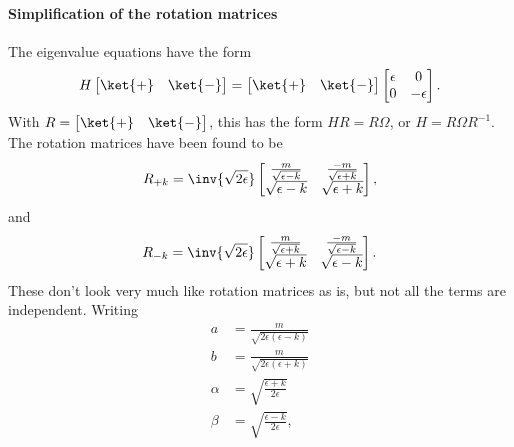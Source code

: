 \paragraph{Simplification of the rotation matrices}
The eigenvalue equations have the form
%
\begin{dmath}\label{eqn:gradQuantumProblemSet4Problem3:240}
H
\begin{bmatrix}
\ket{+} & \ket{-}
\end{bmatrix}
=
\begin{bmatrix}
\ket{+} & \ket{-}
\end{bmatrix}
\begin{bmatrix}
\epsilon & 0 \\
0 & -\epsilon
\end{bmatrix}.
\end{dmath}
With \( R = \begin{bmatrix} \ket{+} & \ket{-} \end{bmatrix} \), this has the form \( H R = R \Omega \), or \( H = R \Omega R^{-1} \).  The rotation matrices have been found to be
%
\begin{dmath}\label{eqn:gradQuantumProblemSet4Problem3:260}
R_{+k}
=
\inv{\sqrt{2\epsilon}}
\begin{bmatrix}
\frac{m}{\sqrt{\epsilon - k}} & \frac{-m}{\sqrt{\epsilon + k}} \\
\sqrt{\epsilon - k} & \sqrt{\epsilon + k}
\end{bmatrix},
\end{dmath}
%
and
\begin{dmath}\label{eqn:gradQuantumProblemSet4Problem3:280}
R_{-k}
=
\inv{\sqrt{2\epsilon}}
\begin{bmatrix}
\frac{m}{\sqrt{\epsilon + k}} & \frac{-m}{\sqrt{\epsilon - k}} \\
\sqrt{\epsilon + k} & \sqrt{\epsilon - k}
\end{bmatrix}.
\end{dmath}
%
These don't look very much like rotation matrices as is, but not all the terms are independent.  Writing
%
\begin{dmath}\label{eqn:gradQuantumProblemSet4Problem3:300}
\begin{aligned}
a &= \frac{m}{\sqrt{2\epsilon(\epsilon - k)}} \\
b &= \frac{m}{\sqrt{2\epsilon(\epsilon + k)}} \\
\alpha &= \sqrt{\frac{\epsilon + k}{2 \epsilon}} \\
\beta &= \sqrt{\frac{\epsilon - k}{2 \epsilon}},
\end{aligned}
\end{dmath}
